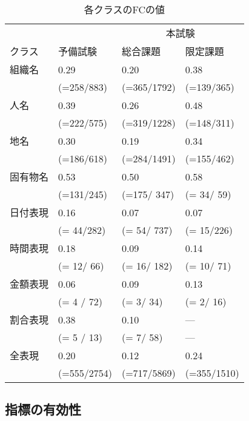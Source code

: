 \begin{table}[t]\small
\caption{\label{table:FC}各クラスのFCの値}
\begin{center}
\begin{tabular}{|l||l|l|l|} \hline
         &             & \multicolumn{2}{|c|}{本試験} \\ \cline{3-4}
クラス   & 予備試験    & 総合課題    & 限定課題    \\ \hline \hline
組織名   & 0.29        & 0.20        & 0.38        \\ 
         & (=258/883)  & (=365/1792) & (=139/365)  \\ \hline
人名     & 0.39        & 0.26        & 0.48        \\ 
         & (=222/575)  & (=319/1228) & (=148/311)  \\ \hline
地名     & 0.30        & 0.19        & 0.34        \\ 
         & (=186/618)  & (=284/1491) & (=155/462)  \\ \hline
固有物名 & 0.53        & 0.50        & 0.58        \\ 
         & (=131/245)  & (=175/ 347) & (= 34/ 59)  \\ \hline
日付表現 & 0.16        & 0.07        & 0.07        \\ 
         & (= 44/282)  & (= 54/ 737) & (= 15/226)  \\ \hline
時間表現 & 0.18        & 0.09        & 0.14        \\ 
         & (= 12/ 66)  & (= 16/ 182) & (= 10/ 71)  \\ \hline
金額表現 & 0.06        & 0.09        & 0.13        \\ 
         & (= 4 / 72)  & (=  3/  34) & (=  2/ 16)  \\ \hline
割合表現 & 0.38        & 0.10        &  ---        \\ 
         & (= 5 / 13)  & (=  7/  58) &  ---        \\ \hline \hline
全表現   & 0.20        & 0.12        & 0.24        \\
         & (=555/2754) & (=717/5869) & (=355/1510) \\ \hline
\end{tabular}
\end{center}
\end{table}

\subsection{指標の有効性}

